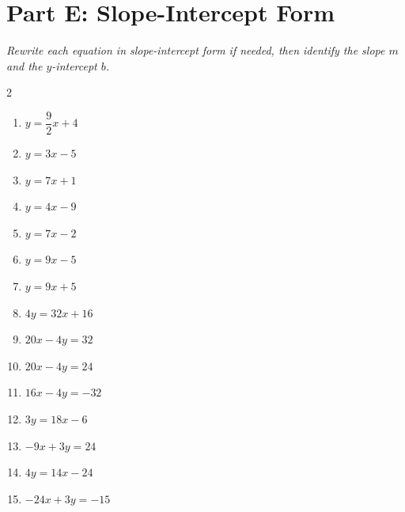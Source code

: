 \documentclass[11pt]{article}
\begin{document}
\section*{Part E: Slope-Intercept Form}
\noindent\textit{Rewrite each equation in slope-intercept form if needed, then identify the slope $m$ and the $y$-intercept $b$.}
\begin{multicols}{2}
\begin{enumerate}
  \item $y = \dfrac{9}{2}x + 4$
  \vspace{1.8cm}
  \item $y = 3x - 5$
  \vspace{1.8cm}
  \item $y = 7x + 1$
  \vspace{1.8cm}
  \item $y = 4x - 9$
  \vspace{1.8cm}
  \item $y = 7x - 2$
  \vspace{1.8cm}
  \item $y = 9x - 5$
  \vspace{1.8cm}
  \item $y = 9x + 5$
  \vspace{1.8cm}
  \item $4y = 32x + 16$
  \vspace{1.8cm}
  \item $20x - 4y = 32$
  \vspace{1.8cm}
  \item $20x - 4y = 24$
  \vspace{1.8cm}
  \item $16x - 4y = -32$
  \vspace{1.8cm}
  \item $3y = 18x - 6$
  \vspace{1.8cm}
  \item $-9x + 3y = 24$
  \vspace{1.8cm}
  \item $4y = 14x - 24$
  \vspace{1.8cm}
  \item $-24x + 3y = -15$
  \vspace{1.8cm}
\end{enumerate}
\end{multicols}
\end{document}

